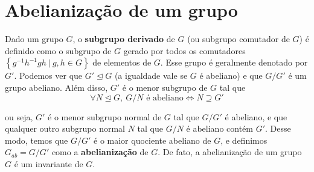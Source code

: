 	\section{Abelianização de um grupo}
    	Dado um grupo $G$, o \textbf{subgrupo derivado} de $G$ (ou subgrupo comutador de $G$) é definido 
    	como o subgrupo de $G$ gerado por todos os comutadores $\left\{ g^{-1}h^{-1}gh \ | \ g,h\in G \right\}$ 
    	de elementos de $G$. Esse grupo é geralmente denotado por $G'$. Podemos ver que $G'\trianglelefteq G$ 
    	(a igualdade vale se $G$ é abeliano) e que $G/G'$ é um grupo abeliano. Além disso, $G'$ é o menor 
    	subgrupo de $G$ tal que
    	\begin{equation*}
    	    \forall N\trianglelefteq G, \ G/N \text{ é abeliano} \iff N\supseteq G'
    	\end{equation*}
    	\par\vspace{0.3cm} ou seja, $G'$ é o menor subgrupo normal de $G$ tal que $G/G'$ é abeliano, 
    	e que qualquer outro subgrupo normal $N$ tal que $G/N$ é abeliano contém $G'$. Desse modo, temos 
    	que $G/G'$ é o maior quociente abeliano de $G$, e definimos $G_{ab} = G/G'$ como a 
    	\textbf{abelianização} de $G$. De fato, a abelianização de um grupo $G$ é um invariante de $G$.
    	
